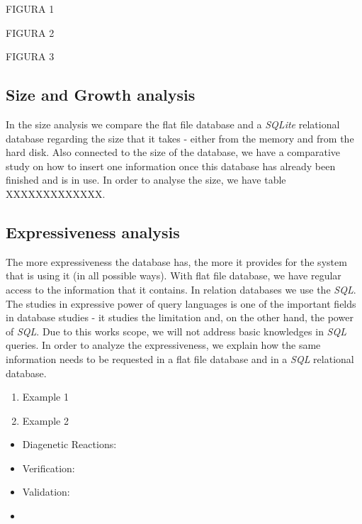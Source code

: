 FIGURA 1 

FIGURA 2

FIGURA 3

\subsection{Size and Growth analysis}
In the size analysis we compare the flat file database and a \emph{SQLite} relational database regarding the size that it takes - either from the memory and from the hard disk. Also connected to the size of the database, we have a comparative study on how to insert one information once this database has already been finished and is in use.
In order to analyse the size, we have table XXXXXXXXXXXXX.

\subsection{Expressiveness analysis}
The more expressiveness the database has, the more it provides for the system that is using it (in all possible ways). With flat file database, we have regular access to the information that it contains. In relation databases we use the \emph{SQL}. The studies in expressive power of query languages is one of the important fields in database studies - it studies the limitation and, on the other hand, the power of \emph{SQL}. Due to this works scope, we will not address basic knowledges in \emph{SQL} queries. 
In order to analyze the expressiveness, we explain how the same information needs to be requested in a flat file database and in a \emph{SQL} relational database. 

\begin{enumerate}
    \item Example 1
    \item Example 2
\end{enumerate}


\begin{itemize}
    \item Diagenetic Reactions:
    \item Verification: 
    \item Validation: 
    \item 
\end{itemize}